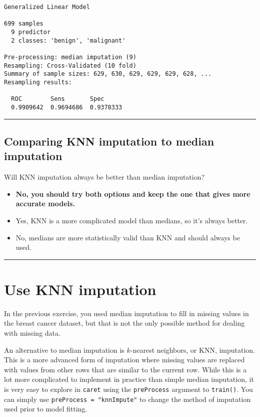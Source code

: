 \documentclass[]{book}
\begin{document}
\begin{verbatim}
Generalized Linear Model 

699 samples
  9 predictor
  2 classes: 'benign', 'malignant' 

Pre-processing: median imputation (9) 
Resampling: Cross-Validated (10 fold) 
Summary of sample sizes: 629, 630, 629, 629, 629, 628, ... 
Resampling results:

  ROC        Sens       Spec     
  0.9909642  0.9694686  0.9378333
\end{verbatim}

\begin{center}\rule{0.5\linewidth}{\linethickness}\end{center}

\subsection*{Comparing KNN imputation to median
imputation}\label{comparing-knn-imputation-to-median-imputation}

Will KNN imputation always be better than median imputation?

\begin{itemize}
\item
  \textbf{No, you should try both options and keep the one that gives
  more accurate models.}
\item
  Yes, KNN is a more complicated model than medians, so it's always
  better.
\item
  No, medians are more statistically valid than KNN and should always be
  used.
\end{itemize}

\begin{center}\rule{0.5\linewidth}{\linethickness}\end{center}

\section{Use KNN imputation}\label{use-knn-imputation}

In the previous exercise, you used median imputation to fill in missing
values in the breast cancer dataset, but that is not the only possible
method for dealing with missing data.

An alternative to median imputation is \(k\)-nearest neighbors, or KNN,
imputation. This is a more advanced form of imputation where missing
values are replaced with values from other rows that are similar to the
current row. While this is a lot more complicated to implement in
practice than simple median imputation, it is very easy to explore in
\texttt{caret} using the \texttt{preProcess} argument to
\texttt{train()}. You can simply use \texttt{preProcess\ =\ "knnImpute"}
to change the method of imputation used prior to model fitting.
\end{document}
